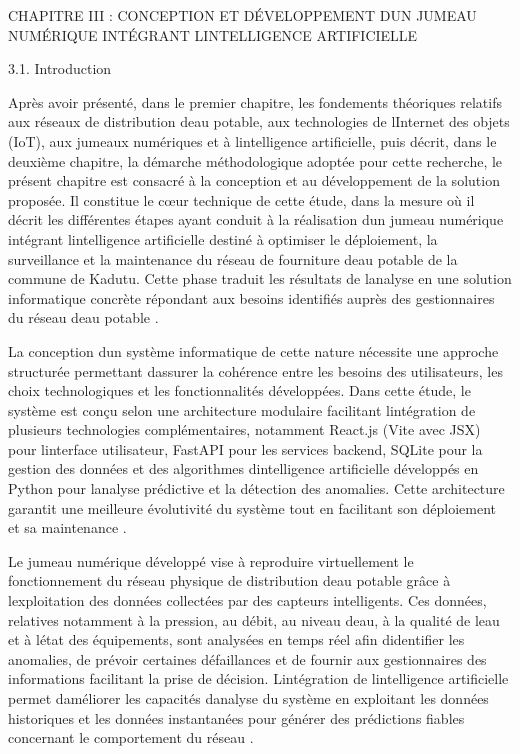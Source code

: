 \documentclass[12pt,a4paper,oneside]{report}
\begin{document}
CHAPITRE III : CONCEPTION ET DÉVELOPPEMENT D\textquotesingle UN JUMEAU
NUMÉRIQUE INTÉGRANT L\textquotesingle INTELLIGENCE ARTIFICIELLE

3.1. Introduction

Après avoir présenté, dans le premier chapitre, les fondements
théoriques relatifs aux réseaux de distribution d\textquotesingle eau
potable, aux technologies de l\textquotesingle Internet des objets
(IoT), aux jumeaux numériques et à l\textquotesingle intelligence
artificielle, puis décrit, dans le deuxième chapitre, la démarche
méthodologique adoptée pour cette recherche, le présent chapitre est
consacré à la conception et au développement de la solution proposée. Il
constitue le cœur technique de cette étude, dans la mesure où il décrit
les différentes étapes ayant conduit à la réalisation
d\textquotesingle un jumeau numérique intégrant
l\textquotesingle intelligence artificielle destiné à optimiser le
déploiement, la surveillance et la maintenance du réseau de fourniture
d\textquotesingle eau potable de la commune de Kadutu. Cette phase
traduit les résultats de l\textquotesingle analyse en une solution
informatique concrète répondant aux besoins identifiés auprès des
gestionnaires du réseau d\textquotesingle eau potable \cite{ref106}.

La conception d\textquotesingle un système informatique de cette nature
nécessite une approche structurée permettant d\textquotesingle assurer
la cohérence entre les besoins des utilisateurs, les choix
technologiques et les fonctionnalités développées. Dans cette étude, le
système est conçu selon une architecture modulaire facilitant
l\textquotesingle intégration de plusieurs technologies complémentaires,
notamment React.js (Vite avec JSX) pour l\textquotesingle interface
utilisateur, FastAPI pour les services backend, SQLite pour la gestion
des données et des algorithmes d\textquotesingle intelligence
artificielle développés en Python pour l\textquotesingle analyse
prédictive et la détection des anomalies. Cette architecture garantit
une meilleure évolutivité du système tout en facilitant son déploiement
et sa maintenance \cite{ref114}.

Le jumeau numérique développé vise à reproduire virtuellement le
fonctionnement du réseau physique de distribution d\textquotesingle eau
potable grâce à l\textquotesingle exploitation des données collectées
par des capteurs intelligents. Ces données, relatives notamment à la
pression, au débit, au niveau d\textquotesingle eau, à la qualité de
l\textquotesingle eau et à l\textquotesingle état des équipements, sont
analysées en temps réel afin d\textquotesingle identifier les anomalies,
de prévoir certaines défaillances et de fournir aux gestionnaires des
informations facilitant la prise de décision.
L\textquotesingle intégration de l\textquotesingle intelligence
artificielle permet d\textquotesingle améliorer les capacités
d\textquotesingle analyse du système en exploitant les données
historiques et les données instantanées pour générer des prédictions
fiables concernant le comportement du réseau \cite{ref17}.
\end{document}
